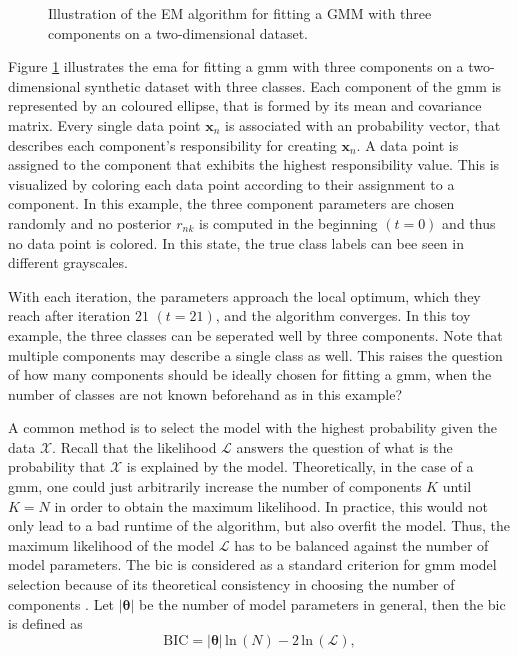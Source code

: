 \documentclass[../../../main.tex]{subfiles}
\begin{document}
 \begin{figure}[b!]
    \centering
    
    \caption{Illustration of the EM algorithm for fitting a GMM with three components on a two-dimensional dataset.}
    \label{fig:em_algo_gmm}
\end{figure}

Figure \ref{fig:em_algo_gmm} illustrates the \gls{ema} for fitting a \gls{gmm} with three components on a two-dimensional synthetic dataset with three classes. Each component of the \gls{gmm} is represented by an coloured ellipse, that is formed by its mean and covariance matrix. Every single data point $\bm{x}_n$ is associated with an probability vector, that describes each component's responsibility for creating $\bm{x}_n$. A data point is assigned to the component that exhibits the highest responsibility value. This is visualized by coloring each data point according to their assignment to a component. In this example, the three component parameters are chosen randomly and no posterior $r_{nk}$ is computed in the beginning $(t=0)$ and thus no data point is colored. In this state, the true class labels can bee seen in different grayscales. 

With each iteration, the parameters approach the local optimum, which they reach after iteration $21$ $(t=21)$, and the algorithm converges. In this toy example, the three classes can be seperated well by three components. Note that multiple components may describe a single class as well. This raises the question of how many components should be ideally chosen for fitting a \gls{gmm}, when the number of classes are not known beforehand as in this example? 

A common method is to select the model with the highest probability given the data $\mathcal{X}$. Recall that the likelihood $\mathcal{L}$ answers the question of what is the probability that $\mathcal{X}$ is explained by the model. Theoretically, in the case of a \gls{gmm}, one could just arbitrarily increase the number of components $K$ until $K = N$ in order to obtain the maximum likelihood. In practice, this would not only lead to a bad runtime of the algorithm, but also overfit the model. Thus, the maximum likelihood of the model $\mathcal{L}$ has to be balanced against the number of model parameters. The \gls{bic} is considered as a standard criterion for \gls{gmm} model selection because of its theoretical consistency in choosing the number of components \cite{keribin2000consistent}. Let $|\bm{\theta}|$ be the number of model parameters in general, then the \gls{bic} is defined as
\begin{equation}
    \text{BIC} = |\bm{\theta}| \, \text{ln} \, (N) - 2 \, \text{ln} \, (\mathcal{L}),
\end{equation}
\end{document}
